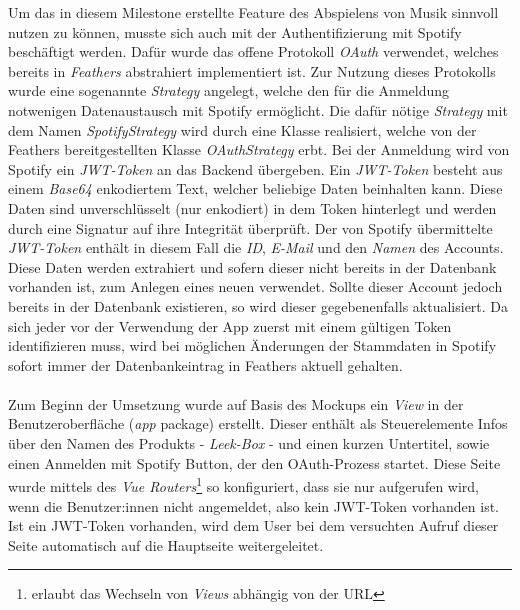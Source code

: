 \documentclass[10pt, a4paper]{article}
\begin{document}
\begin{onehalfspace}
Um das in diesem Milestone erstellte Feature des Abspielens von Musik sinnvoll nutzen zu können, musste sich auch mit der Authentifizierung mit Spotify beschäftigt
werden. Dafür wurde das offene Protokoll \textit{OAuth} verwendet, welches bereits in \textit{Feathers} abstrahiert implementiert ist. Zur Nutzung dieses
Protokolls wurde eine sogenannte \textit{Strategy} angelegt, welche den für die Anmeldung notwenigen Datenaustausch mit Spotify ermöglicht.
Die dafür nötige \textit{Strategy} mit dem Namen \textit{SpotifyStrategy} wird durch eine Klasse realisiert, welche von der Feathers bereitgestellten Klasse
\textit{OAuthStrategy} erbt. Bei der Anmeldung wird von Spotify ein \textit{JWT-Token} an das Backend übergeben. Ein \textit{JWT-Token} besteht aus einem \textit{Base64}
enkodiertem Text, welcher beliebige Daten beinhalten kann. Diese Daten sind unverschlüsselt (nur enkodiert) in dem Token hinterlegt und werden
durch eine Signatur auf ihre Integrität überprüft. Der von Spotify übermittelte \textit{JWT-Token} enthält in diesem Fall die \textit{ID}, \textit{E-Mail} und den \textit{Namen} des Accounts. Diese Daten werden extrahiert und sofern dieser nicht bereits in der Datenbank vorhanden ist, zum Anlegen eines neuen verwendet.
Sollte dieser Account jedoch bereits in der Datenbank existieren, so wird dieser gegebenenfalls aktualisiert. Da sich jeder vor der Verwendung der App
zuerst mit einem gültigen Token identifizieren muss, wird bei möglichen Änderungen der Stammdaten in Spotify sofort immer der Datenbankeintrag in Feathers aktuell gehalten.
\\~\\
Zum Beginn der Umsetzung wurde auf Basis des Mockups ein \textit{View} in der Benutzeroberfläche (\textit{app} package) erstellt. Dieser enthält als Steuerelemente Infos
über den Namen des Produkts - \textit{Leek-Box} - und einen kurzen Untertitel, sowie einen \glqq Anmelden mit Spotify\grqq{} Button, der den OAuth-Prozess startet.
Diese Seite wurde mittels des \textit{Vue Routers}\footnote{erlaubt das Wechseln von \textit{Views} abhängig von der URL} so konfiguriert, dass sie nur aufgerufen wird, wenn die Benutzer:innen nicht angemeldet, also kein JWT-Token
vorhanden ist. Ist ein JWT-Token vorhanden, wird dem User bei dem versuchten Aufruf dieser Seite automatisch auf die Hauptseite weitergeleitet.


\end{onehalfspace}
\end{document}
